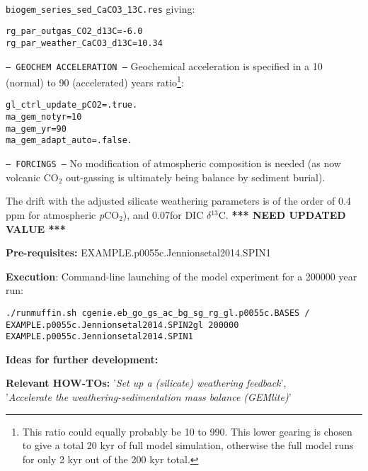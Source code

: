 \documentclass[10pt,twoside]{article}
\begin{document}
\begin{compactitem}
\\\texttt{biogem\_series\_sed\_CaCO3\_13C.res}
giving:
\vspace{-5pt}\begin{verbatim}
rg_par_outgas_CO2_d13C=-6.0
rg_par_weather_CaCO3_d13C=10.34
\end{verbatim}\vspace{-5pt}
                \item \texttt{--- GEOCHEM ACCELERATION ---}
Geochemical acceleration is specified in a 10 (normal) to 90 (accelerated) years ratio\footnote{This ratio could equally probably be 10 to 990. This lower gearing is chosen to give a total 20 kyr of full model simulation, otherwise the full model runs for only 2 kyr out of the 200 kyr total.}:
\vspace{-5pt}\begin{verbatim}
gl_ctrl_update_pCO2=.true.
ma_gem_notyr=10
ma_gem_yr=90
ma_gem_adapt_auto=.false.
\end{verbatim}\vspace{-5pt}
\item \texttt{--- FORCINGS ---}
No modification of atmospheric composition is needed (as now volcanic CO$_{2}$ out-gassing is ultimately being balance by sediment burial).
\end{compactitem}

The drift with the adjusted silicate weathering parameters is of the order of 0.4 ppm for atmospheric \textit{p}CO${_2}$), and 0.07\permil for DIC $\delta$$^{13}$C. \textbf{*** NEED UPDATED VALUE ***}

\noindent \textbf{Pre-requisites:} EXAMPLE.p0055c.Jennionsetal2014.SPIN1

\noindent \textbf{Execution}: Command-line launching of the model experiment for a 200000 year run:
\vspace{-10pt}\small\begin{verbatim}
./runmuffin.sh cgenie.eb_go_gs_ac_bg_sg_rg_gl.p0055c.BASES / 
EXAMPLE.p0055c.Jennionsetal2014.SPIN2gl 200000 
EXAMPLE.p0055c.Jennionsetal2014.SPIN1 
\end{verbatim}\normalsize\vspace{-10pt}

\noindent \textbf{Ideas for further development:} 

\noindent \textbf{Relevant HOW-TOs:} '\textit{Set up a (silicate) weathering feedback}',
\\'\textit{Accelerate the weathering-sedimentation mass balance (GEMlite)}'
\end{document}
